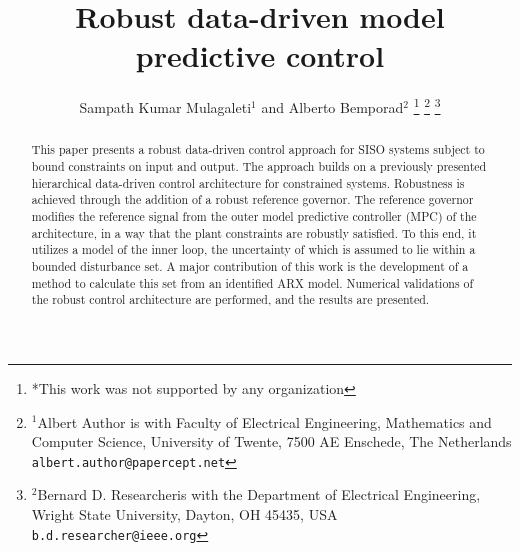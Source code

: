 \documentclass[letterpaper, 10 pt, conference]{ieeeconf}  %
\title{\LARGE \bf
Robust data-driven model predictive control
}
\author{Sampath Kumar Mulagaleti$^{1}$ and Alberto Bemporad$^{2}$%
\thanks{*This work was not supported by any organization}%
\thanks{$^{1}$Albert Author is with Faculty of Electrical Engineering, Mathematics and Computer Science,
        University of Twente, 7500 AE Enschede, The Netherlands
        {\tt\small albert.author@papercept.net}}%
\thanks{$^{2}$Bernard D. Researcheris with the Department of Electrical Engineering, Wright State University,
        Dayton, OH 45435, USA
        {\tt\small b.d.researcher@ieee.org}}%
}
\begin{document}
\maketitle
\thispagestyle{empty}
\pagestyle{empty}


\begin{abstract}

This paper presents a robust data-driven control approach for SISO systems subject to bound constraints on input and output.
 The approach builds on a previously presented hierarchical data-driven control architecture for constrained systems. Robustness is achieved through the addition of a robust reference governor. The reference governor modifies the reference signal from the outer model predictive controller (MPC) of the architecture, in a way that the plant constraints are robustly satisfied. To this end, it utilizes a model of the inner loop, the uncertainty of which is assumed to lie within a bounded disturbance set. A major contribution of this work is the development of a method to calculate this set from an identified ARX model. Numerical validations of the robust control architecture are performed, and the results are presented.

\end{abstract}


\end{document}
